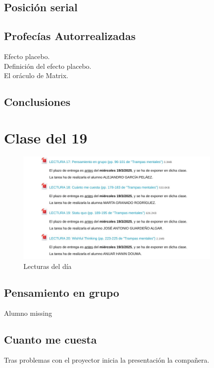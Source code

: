 \documentclass[12pt, a4paper, twoside]{article}
\begin{document}
\subsection{Posición serial}
\subsection{}
\subsection{Profecías Autorrealizadas}
Efecto placebo.\\
Definición del efecto placebo.\\
El oráculo de Matrix.\\
\subsection{Conclusiones}


\section{Clase del 19\\}


\begin{figure}[h]
    \centering
    \includegraphics[width=0.9\textwidth]{./Images/0319.jpg}
    \caption{Lecturas del día}
\end{figure}

\subsection{Pensamiento en grupo}
Alumno missing
\subsection{Cuanto me cuesta}
Tras problemas con el proyector inicia la presentación la compañera.
\end{document}
